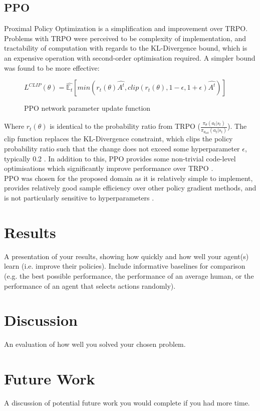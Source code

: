 \documentclass{article}
\begin{document}
\subsection{PPO}
Proximal Policy Optimization \citep{schulman2017proximal} is a simplification and improvement over TRPO. Problems with TRPO were perceived to be complexity of implementation, and tractability of computation with regards to the KL-Divergence bound, which is an expensive operation with second-order optimisation required. A simpler bound was found to be more effective:
\begin{figure}[H]
  \centering
  $
      L^{CLIP}(\theta) = \hat{\mathbb{E}_t}\left[min(r_t(\theta)\hat{A^t},clip(r_t(\theta),1-\epsilon,1+\epsilon)\hat{A^t})\right]
  $ 
  \caption{PPO network parameter update function}
  \label{ppoupdate}
\end{figure}
Where $r_t(\theta)$ is identical to the probability ratio from TRPO ($\frac{\pi_\theta(a_t | s_t)}{\pi_{\theta_{old}}(a_t | s_t)}$). The clip function replaces the KL-Divergence constraint, which clips the policy probability ratio such that the change does not exceed some hyperparameter $\epsilon$, typically 0.2 \citep{schulman2017proximal}. In addition to this, PPO provides some non-trivial code-level optimisations which significantly improve performance over TRPO \citep{Engstrom2020Implementation}. \\\newline
PPO was chosen for the proposed domain as it is relatively simple to implement, provides relatively good sample efficiency over other policy gradient methods, and is not particularly sensitive to hyperparameters \citep{schulman2017proximal}.

\section{Results}
A presentation of your results, showing how quickly and how well your agent(s)
learn (i.e. improve their policies). Include informative baselines for comparison (e.g. the best
possible performance, the performance of an average human, or the performance of an agent
that selects actions randomly).

\section{Discussion}
An evaluation of how well you solved your chosen problem.

\section{Future Work}
A discussion of potential future work you would complete if you had more
time.
\end{document}
